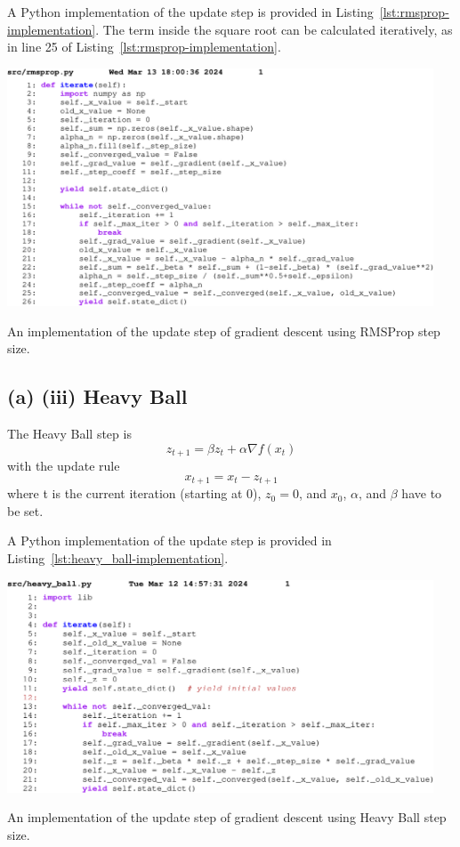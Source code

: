 A Python implementation of the update step is provided in
Listing~\ref{lst:rmsprop-implementation}. The term inside the square root
can be calculated iteratively, as in line 25 of
Listing~\ref{lst:rmsprop-implementation}.


\begin{listing}
  \begin{center}
    \includegraphics[width=0.95\textwidth]{fig/rmsprop-code.pdf}
  \end{center}
  \caption{An implementation of the update step of gradient descent using RMSProp step size.}\label{lst:rmsprop-implementation}
\end{listing}

\subsection{(a) (iii) Heavy Ball}

The Heavy Ball step is
\begin{equation}
  z_{t+1}=\beta z_t + \alpha\nabla f(x_t)
\end{equation}
with the update rule \begin{equation}
  x_{t+1}=x_t-z_{t+1}
\end{equation}
where t is the current iteration (starting at 0), $z_0=0$, and
$x_0$, $\alpha$, and $\beta$ have to be set.

A Python implementation of the update step is provided in Listing~\ref{lst:heavy_ball-implementation}.

\begin{listing}
  \begin{center}
    \includegraphics[width=0.95\textwidth]{fig/heavy_ball-code.pdf}
  \end{center}
  \caption{An implementation of the update step of gradient descent using Heavy Ball step size.}\label{lst:heavy_ball-implementation}
\end{listing}

